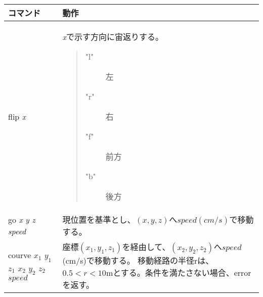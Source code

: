 \documentclass[a4paper, 12pt]{ltjsarticle}
\begin{document}
\begin{description}
        \begin{table}[h]
            \hspace{3\zw}
            \begin{tabular}{ll}
                \hline
                コマンド & 動作 \\ \hline \hline
                flip \emph{x} &
                \begin{minipage}{0.45\textwidth}
                    \vspace{0.5\zh}
                    \emph{x}で示す方向に宙返りする。
                    \vspace{-1\zh}
                    \begin{quote}
                        \begin{description}
                            \item["l"] 左
                            \item["r"] 右
                            \item["f"] 前方
                            \item["b"] 後方
                        \end{description}
                    \end{quote}
                    \vspace{-0.5\zh}
                \end{minipage} \\ \hline
                go \emph{x} \emph{y} \emph{z} \emph{speed} &
                \begin{minipage}{0.45\textwidth}
                    \vspace{0.5\zh}
                    現位置を基準とし、\((x,y,z)\)へ\(speed(cm/s)\)で移動する。
                    \vspace{0.5\zh}
                \end{minipage} \\ \hline
                courve \(x_1\) \(y_1\) \(z_1\) \(x_2\) \(y_2\) \(z_2\) \(speed\) &
                \begin{minipage}{0.45\textwidth}
                    \vspace{0.5\zh}
                    座標\((x_1,y_1,z_1)\)を経由して、\((x_2,y_2,z_2)\)へ\(speed\)(cm/s)で移動する。
                    移動経路の半径rは、\(0.5 < r < 10\)mとする。条件を満たさない場合、errorを返す。
                    \vspace{0.5\zh}
                \end{minipage} \\ \hline

\end{tabular}
\end{table}
\end{description}
\end{document}
